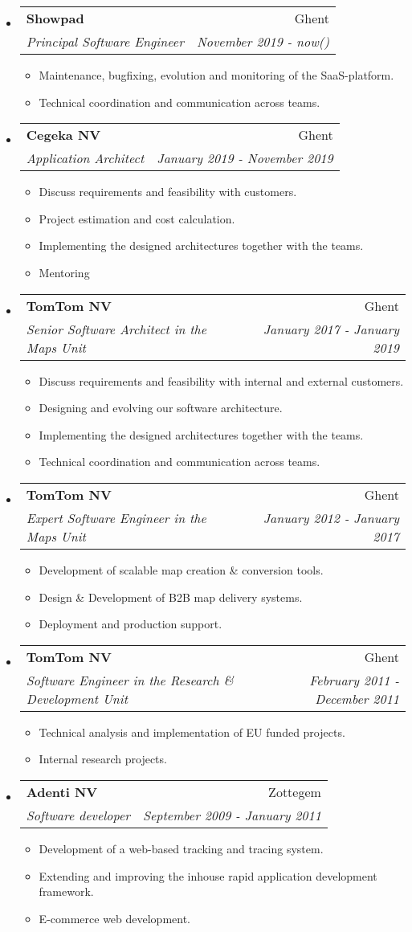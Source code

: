 \documentclass[letterpaper,11pt]{article}
\makeatletter
\newcommand{\resitem}[1]{\item #1 \vspace{-2pt}}
\newcommand{\ressubheading}[4]{
	\begin{tabular*}{6.5in}{l@{\extracolsep{\fill}}r}
		\textbf{#1} & #2 \\
		\textit{#3} & \textit{#4} \\
	\end{tabular*}\vspace{-6pt}}
\makeatother
\begin{document}
	\begin{itemize}
		
		\item
		\ressubheading{Showpad}{Ghent}{Principal Software Engineer}{November 2019 - now()}
		\begin{itemize}
			\resitem{Maintenance, bugfixing, evolution and monitoring of the SaaS-platform.}
			\resitem{Technical coordination and communication across teams.}
		\end{itemize}
		
		\item
		\ressubheading{Cegeka NV}{Ghent}{Application Architect}{January 2019 - November 2019}
		\begin{itemize}
			\resitem{Discuss requirements and feasibility with customers.}		
			\resitem{Project estimation and cost calculation.}	
			\resitem{Implementing the designed architectures together with the teams.}
			\resitem{Mentoring}
		\end{itemize}
		
		\item
		\ressubheading{TomTom NV}{Ghent}{Senior Software Architect in the Maps Unit}{January 2017 - January 2019}
		\begin{itemize}
			\resitem{Discuss requirements and feasibility with internal and external customers.}		
			\resitem{Designing and evolving our software architecture.}	
			\resitem{Implementing the designed architectures together with the teams.}
			\resitem{Technical coordination and communication across teams.}
		\end{itemize}
		
		\item
		\ressubheading{TomTom NV}{Ghent}{Expert Software Engineer in the Maps Unit}{January 2012 - January 2017}
		\begin{itemize}
			\resitem{Development of scalable map creation \& conversion tools.}
			\resitem{Design \& Development of B2B map delivery systems.}
			\resitem{Deployment and production support.}
		\end{itemize}
		
		\item
		\ressubheading{TomTom NV}{Ghent}{Software Engineer in the Research \& Development Unit}{February 2011 - December 2011}
		\begin{itemize}
			\resitem{Technical analysis and implementation of EU funded projects.}
			\resitem{Internal research projects.}
		\end{itemize}
		
		\item 
		\ressubheading{Adenti NV}{Zottegem}{Software developer}{September 2009 - January 2011}
		\begin{itemize}
			\resitem{Development of a web-based tracking and tracing system.}
			\resitem{Extending and improving the inhouse rapid application development framework.}
			\resitem{E-commerce web development.}
		\end{itemize}
		
	\end{itemize}
	
\end{document}
